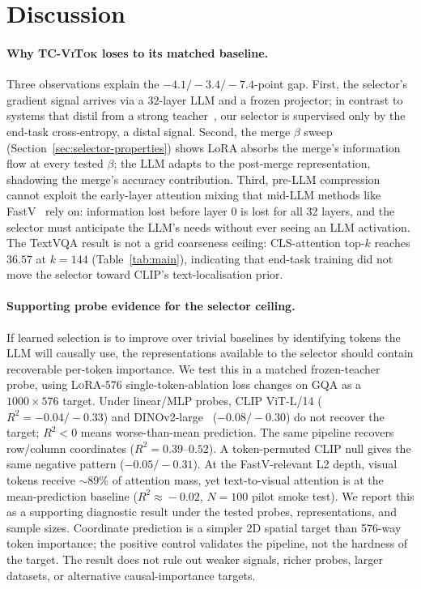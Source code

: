\documentclass[runningheads]{llncs}
\begin{document}
\section{Discussion}
\label{sec:discussion}

\paragraph{Why \textsc{TC-ViTok} loses to its matched baseline.}
Three observations explain the $-4.1/-3.4/-7.4$-point gap. First, the
selector's gradient signal arrives via a 32-layer LLM and a frozen
projector; in contrast to systems that distil from a strong
teacher~\cite{rao2021dynamicvit}, our selector is supervised only by
the end-task cross-entropy, a distal signal. Second, the merge $\beta$
sweep (Section~\ref{sec:selector-properties}) shows LoRA absorbs the
merge's information flow at every tested $\beta$; the LLM adapts to
the post-merge representation, shadowing the merge's accuracy
contribution.
Third, pre-LLM compression cannot exploit the early-layer attention
mixing that mid-LLM methods like FastV~\cite{chen2024fastv} rely on:
information lost before layer 0 is lost for all 32 layers, and the
selector must anticipate the LLM's needs without ever seeing an LLM
activation. The TextVQA result is not a grid coarseness ceiling:
CLS-attention top-$k$ reaches $36.57$ at $k{=}144$
(Table~\ref{tab:main}), indicating that end-task training did not
move the selector toward CLIP's text-localisation prior.

\paragraph{Supporting probe evidence for the selector ceiling.}
If learned selection is to improve over trivial baselines by
identifying tokens the LLM will causally use, the representations
available to the selector should contain recoverable per-token
importance. We test this in a matched frozen-teacher probe, using
\textsc{LoRA-576} single-token-ablation loss changes on GQA as a
$1000{\times}576$ target. Under linear/MLP probes, CLIP ViT-L/14
($R^2{=}{-}0.04/{-}0.33$) and DINOv2-large~\cite{oquab2023dinov2}
(${-}0.08/{-}0.30$) do not recover the target; $R^2{<}0$ means
worse-than-mean prediction. The same pipeline recovers row/column
coordinates ($R^2{=}0.39$--$0.52$). A token-permuted CLIP null gives
the same negative pattern ($-0.05/-0.31$). At the FastV-relevant L2
depth, visual tokens receive ${\sim}89\%$ of attention mass, yet
text-to-visual attention is at the mean-prediction baseline
($R^2\!\approx\!-0.02$, $N{=}100$ pilot smoke test). We report this as a
supporting diagnostic result under the tested probes, representations,
and sample sizes. Coordinate prediction is a simpler 2D spatial target
than 576-way token importance; the positive control validates the
pipeline, not the hardness of the target. The result does not rule out
weaker signals, richer probes, larger datasets, or alternative
causal-importance targets.
\end{document}
